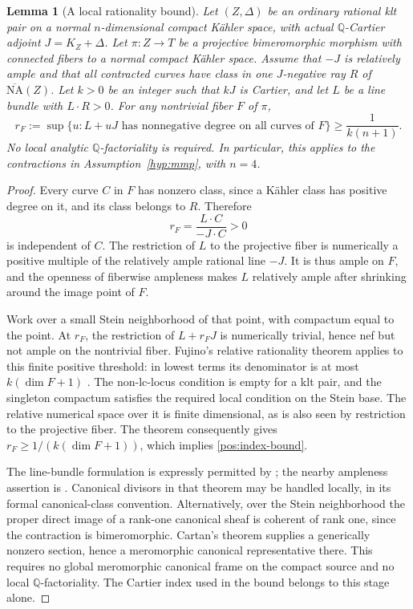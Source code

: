 \documentclass[11pt,letterpaper]{article}
\newcommand{\Q}{\mathbb{Q}}
\newcommand{\NA}{\overline{\mathrm{NA}}}
\newtheorem{lemma}[theorem]{Lemma}
\theoremstyle{definition}
\theoremstyle{remark}
\begin{document}
\begin{lemma}[A local rationality bound]\label{pos:rationality}
Let \((Z,\Delta)\) be an ordinary rational klt pair on a normal
\(n\)-dimensional compact Kähler space, with actual \(\Q\)-Cartier
adjoint \(J=K_Z+\Delta\). Let \(\pi:Z\to T\) be a projective
bimeromorphic morphism with connected fibers to a normal compact
Kähler space. Assume that \(-J\) is relatively ample and that all
contracted curves have class in one \(J\)-negative ray \(R\) of
\(\NA(Z)\). Let \(k>0\) be an integer such that \(kJ\) is Cartier,
and let \(L\) be a line bundle with \(L\cdot R>0\). For any
nontrivial fiber \(F\) of \(\pi\),
\begin{equation}\label{pos:index-bound}
 r_F:=\sup\{u:L+uJ\text{ has nonnegative degree on all curves of }F\}
 \geq\frac{1}{k(n+1)}.
\end{equation}
No local analytic \(\Q\)-factoriality is required.
In particular, this applies to the contractions in
Assumption~\ref{hyp:mmp}, with \(n=4\).
\end{lemma}

\begin{proof}
Every curve \(C\) in \(F\) has nonzero class, since a Kähler class
has positive degree on it, and its class belongs to \(R\). Therefore
\[
 r_F=\frac{L\cdot C}{-J\cdot C}>0
\]
is independent of \(C\). The restriction of \(L\) to the projective
fiber is numerically a positive multiple of the relatively ample
rational line \(-J\). It is thus ample on \(F\), and the openness of
fiberwise ampleness makes \(L\) relatively ample after shrinking around
the image point of \(F\).

Work over a small Stein neighborhood of that point, with compactum
equal to the point. At \(r_F\), the restriction of \(L+r_FJ\) is
numerically trivial, hence nef but not ample on the nontrivial fiber.
Fujino's relative rationality theorem applies to this finite positive
threshold: in lowest terms its denominator is at most
\(k(\dim F+1)\) \cite[Theorem~4.3.1]{FujinoAnalyticCone}. The
non-lc-locus condition is empty for a klt pair, and the singleton
compactum satisfies the required local condition on the Stein base.
The relative numerical space over it is finite dimensional, as is also
seen by restriction to the projective fiber. The theorem consequently
gives \(r_F\geq1/(k(\dim F+1))\), which implies
\eqref{pos:index-bound}.

The line-bundle formulation is expressly permitted by
\cite[Remark~4.3.4]{FujinoAnalyticCone}; the nearby ampleness assertion
is \cite[Lemma~2.2.4]{FujinoAnalyticCone}. Canonical divisors in that
theorem may be handled locally, in its formal canonical-class
convention. Alternatively, over the Stein neighborhood the proper
direct image of a rank-one canonical sheaf is coherent of rank one,
since the contraction is bimeromorphic. Cartan's theorem supplies a
generically nonzero section, hence a meromorphic canonical
representative there. This requires no global meromorphic canonical
frame on the compact source and no local \(\Q\)-factoriality. The
Cartier index used in the bound belongs to this stage alone.
\end{proof}
\end{document}
